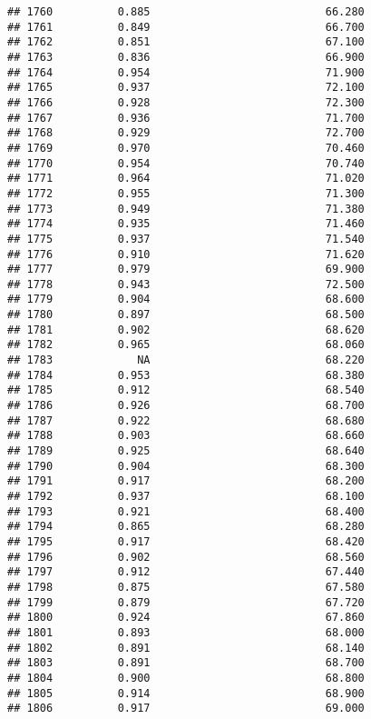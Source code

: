 \documentclass[
]{article}
\begin{document}
\begin{verbatim}
## 1760          0.885                           66.280
## 1761          0.849                           66.700
## 1762          0.851                           67.100
## 1763          0.836                           66.900
## 1764          0.954                           71.900
## 1765          0.937                           72.100
## 1766          0.928                           72.300
## 1767          0.936                           71.700
## 1768          0.929                           72.700
## 1769          0.970                           70.460
## 1770          0.954                           70.740
## 1771          0.964                           71.020
## 1772          0.955                           71.300
## 1773          0.949                           71.380
## 1774          0.935                           71.460
## 1775          0.937                           71.540
## 1776          0.910                           71.620
## 1777          0.979                           69.900
## 1778          0.943                           72.500
## 1779          0.904                           68.600
## 1780          0.897                           68.500
## 1781          0.902                           68.620
## 1782          0.965                           68.060
## 1783             NA                           68.220
## 1784          0.953                           68.380
## 1785          0.912                           68.540
## 1786          0.926                           68.700
## 1787          0.922                           68.680
## 1788          0.903                           68.660
## 1789          0.925                           68.640
## 1790          0.904                           68.300
## 1791          0.917                           68.200
## 1792          0.937                           68.100
## 1793          0.921                           68.400
## 1794          0.865                           68.280
## 1795          0.917                           68.420
## 1796          0.902                           68.560
## 1797          0.912                           67.440
## 1798          0.875                           67.580
## 1799          0.879                           67.720
## 1800          0.924                           67.860
## 1801          0.893                           68.000
## 1802          0.891                           68.140
## 1803          0.891                           68.700
## 1804          0.900                           68.800
## 1805          0.914                           68.900
## 1806          0.917                           69.000

\end{verbatim}
\end{document}
